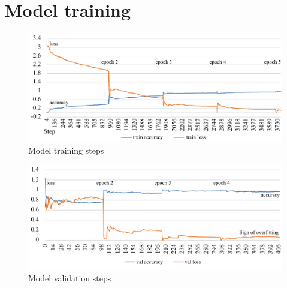 \section{Model training}
\label{sec:Model training}

\begin{figure}[!ht]
    \centering
    \includegraphics[width=\textwidth]{evaluation/imgs/5-train-step.pdf}
    \caption{Model training steps}
    \label{fig:5-train-step}
\end{figure}

\begin{figure}[!ht]
    \centering
    \includegraphics[width=\textwidth]{evaluation/imgs/5-val-steps.pdf}
    \caption{Model validation steps}
    \label{fig:5-val-steps}
\end{figure}